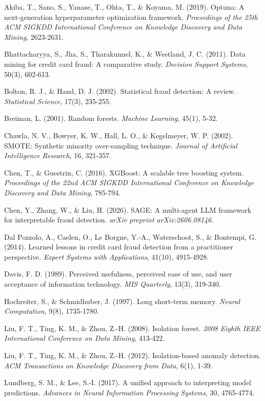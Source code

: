 \documentclass[
  12pt,
]{article}
\begin{document}
Akiba, T., Sano, S., Yanase, T., Ohta, T., \& Koyama, M. (2019). Optuna:
A next-generation hyperparameter optimization framework.
\emph{Proceedings of the 25th ACM SIGKDD International Conference on
Knowledge Discovery and Data Mining}, 2623-2631.

Bhattacharyya, S., Jha, S., Tharakunnel, K., \& Westland, J. C. (2011).
Data mining for credit card fraud: A comparative study. \emph{Decision
Support Systems}, 50(3), 602-613.

Bolton, R. J., \& Hand, D. J. (2002). Statistical fraud detection: A
review. \emph{Statistical Science}, 17(3), 235-255.

Breiman, L. (2001). Random forests. \emph{Machine Learning}, 45(1),
5-32.

Chawla, N. V., Bowyer, K. W., Hall, L. O., \& Kegelmeyer, W. P. (2002).
SMOTE: Synthetic minority over-sampling technique. \emph{Journal of
Artificial Intelligence Research}, 16, 321-357.

Chen, T., \& Guestrin, C. (2016). XGBoost: A scalable tree boosting
system. \emph{Proceedings of the 22nd ACM SIGKDD International
Conference on Knowledge Discovery and Data Mining}, 785-794.

Chen, Y., Zhang, W., \& Liu, H. (2026). SAGE: A multi-agent LLM
framework for interpretable fraud detection. \emph{arXiv preprint
arXiv:2606.08146}.

Dal Pozzolo, A., Caelen, O., Le Borgne, Y.-A., Waterschoot, S., \&
Bontempi, G. (2014). Learned lessons in credit card fraud detection from
a practitioner perspective. \emph{Expert Systems with Applications},
41(10), 4915-4928.

Davis, F. D. (1989). Perceived usefulness, perceived ease of use, and
user acceptance of information technology. \emph{MIS Quarterly}, 13(3),
319-340.

Hochreiter, S., \& Schmidhuber, J. (1997). Long short-term memory.
\emph{Neural Computation}, 9(8), 1735-1780.

Liu, F. T., Ting, K. M., \& Zhou, Z.-H. (2008). Isolation forest.
\emph{2008 Eighth IEEE International Conference on Data Mining},
413-422.

Liu, F. T., Ting, K. M., \& Zhou, Z.-H. (2012). Isolation-based anomaly
detection. \emph{ACM Transactions on Knowledge Discovery from Data},
6(1), 1-39.

Lundberg, S. M., \& Lee, S.-I. (2017). A unified approach to
interpreting model predictions. \emph{Advances in Neural Information
Processing Systems}, 30, 4765-4774.
\end{document}
